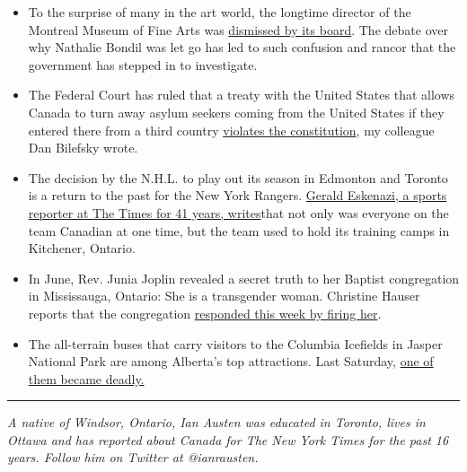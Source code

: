 \begin{itemize}
\item
  To the surprise of many in the art world, the longtime director of the
  Montreal Museum of Fine Arts was
  \href{https://www.nytimes3xbfgragh.onion/2020/07/22/arts/design/montreal-museum-nathalie-bondil.html}{dismissed
  by its board}. The debate over why Nathalie Bondil was let go has led
  to such confusion and rancor that the government has stepped in to
  investigate.
\item
  The Federal Court has ruled that a treaty with the United States that
  allows Canada to turn away asylum seekers coming from the United
  States if they entered there from a third country
  \href{https://www.nytimes3xbfgragh.onion/2020/07/22/world/canada/asylum-Safe-Third-Country-Agreement.html}{violates
  the constitution}, my colleague Dan Bilefsky wrote.
\item
  The decision by the N.H.L. to play out its season in Edmonton and
  Toronto is a return to the past for the New York Rangers.
  \href{https://www.nytimes3xbfgragh.onion/2020/07/19/sports/hockey/coronavirus-nhl-canada-season.html}{Gerald
  Eskenazi, a sports reporter at The Times for 41 years, writes}that not
  only was everyone on the team Canadian at one time, but the team used
  to hold its training camps in Kitchener, Ontario.
\item
  In June, Rev. Junia Joplin revealed a secret truth to her Baptist
  congregation in Mississauga, Ontario: She is a transgender woman.
  Christine Hauser reports that the congregation
  \href{https://www.nytimes3xbfgragh.onion/2020/07/23/world/canada/junia-joplin-transgender-lorne-park-baptist.html}{responded
  this week by firing her}.
\item
  The all-terrain buses that carry visitors to the Columbia Icefields in
  Jasper National Park are among Alberta's top attractions. Last
  Saturday,
  \href{https://www.nytimes3xbfgragh.onion/2020/07/18/world/canada/bus-crash-glacier-jasper-alberta.html}{one
  of them became deadly.}
\end{itemize}

\begin{center}\rule{0.5\linewidth}{\linethickness}\end{center}

\emph{A native of Windsor, Ontario, Ian Austen was educated in Toronto,
lives in Ottawa and has reported about Canada for The New York Times for
the past 16 years. Follow him on Twitter at @ianrausten.}

